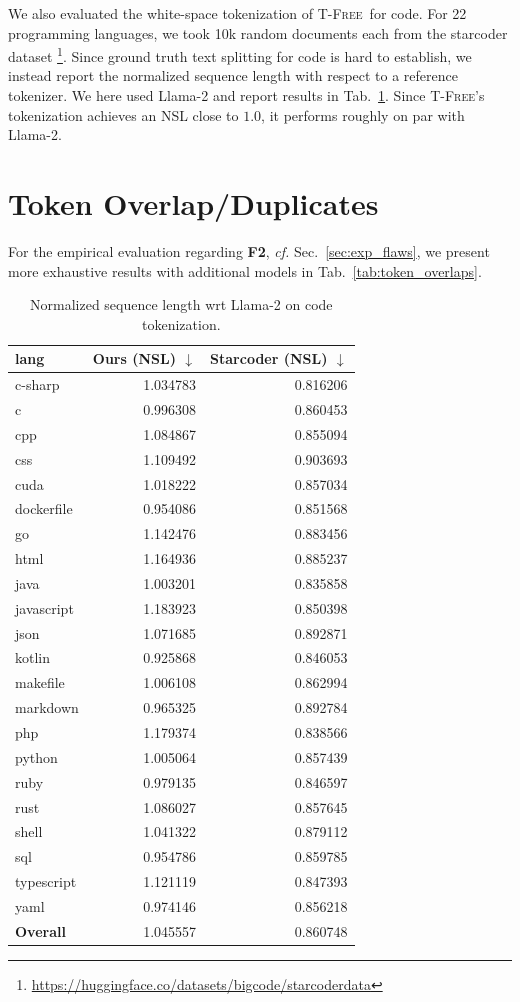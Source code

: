 \documentclass[11pt]{article}
\newcommand{\method}{\textsc{T-Free}}
\begin{document}
We also evaluated the white-space tokenization of \method\ for code. For 22 programming languages, we took 10k random documents each from the starcoder dataset \footnote{\url{https://huggingface.co/datasets/bigcode/starcoderdata}}. Since ground truth text splitting for code is hard to establish, we instead report the normalized sequence length with respect to a reference tokenizer. We here used Llama-2 and report results in
Tab.~\ref{tab:code_nsl}. Since \method's tokenization achieves an NSL close to $1.0$, it performs roughly on par with Llama-2.
\section{Token Overlap/Duplicates}
For the empirical evaluation regarding \textbf{F2}, \emph{cf.} Sec.~\ref{sec:exp_flaws}, we present more exhaustive results with additional models in 
Tab.~\ref{tab:token_overlaps}.
 
\begin{table}[]
    \centering
\begin{tabular}{lrr}
\toprule
     lang & Ours (NSL) $\downarrow$ &  Starcoder (NSL)  $\downarrow$\\
\midrule
    c-sharp &  1.034783 &   0.816206 \\
          c &  0.996308 &   0.860453 \\
        cpp &  1.084867 &   0.855094 \\
        css &  1.109492 &   0.903693 \\
       cuda &  1.018222 &   0.857034 \\
 dockerfile &  0.954086 &   0.851568 \\
         go &  1.142476 &   0.883456 \\
       html &  1.164936 &   0.885237 \\
       java &  1.003201 &   0.835858 \\
 javascript &  1.183923 &   0.850398 \\
       json &  1.071685 &   0.892871 \\
     kotlin &  0.925868 &   0.846053 \\
   makefile &  1.006108 &   0.862994 \\
   markdown &  0.965325 &   0.892784 \\
        php &  1.179374 &   0.838566 \\
     python &  1.005064 &   0.857439 \\
       ruby &  0.979135 &   0.846597 \\
       rust &  1.086027 &   0.857645 \\
      shell &  1.041322 &   0.879112 \\
        sql &  0.954786 &   0.859785 \\
 typescript &  1.121119 &   0.847393 \\
       yaml &  0.974146 &   0.856218 \\

\textbf{Overall} & 1.045557 & 0.860748 \\
\bottomrule
\end{tabular}
    \caption{Normalized sequence length wrt Llama-2 on code tokenization.}
\label{tab:code_nsl}
\end{table}
\end{document}
